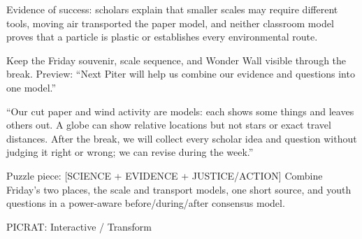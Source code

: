 Evidence of success: scholars explain that smaller scales may require different tools, moving air transported the paper model, and neither classroom model proves that a particle is plastic or establishes every environmental route.

Keep the Friday souvenir, scale sequence, and Wonder Wall visible through the break. Preview: ``Next Piter will help us combine our evidence and questions into one model.''

``Our cut paper and wind activity are models: each shows some things and leaves others out. A globe can show relative locations but not stars or exact travel distances. After the break, we will collect every scholar idea and question without judging it right or wrong; we can revise during the week.''

Puzzle piece: [SCIENCE + EVIDENCE + JUSTICE/ACTION] Combine Friday's two places, the scale and transport models, one short source, and youth questions in a power-aware before/during/after consensus model.

PICRAT: Interactive / Transform
\endgroup
